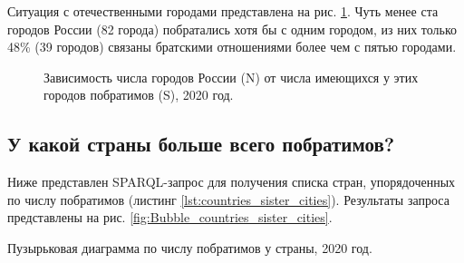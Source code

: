 Ситуация с отечественными городами представлена на рис. \ref{fig:city_relation_Russia_S_N}. Чуть менее ста городов России (82 города) побратались хотя бы с одним городом, из них только 48\% (39 городов) связаны братскими отношениями более чем с пятью городами.

\begin{figure}
{
\setlength{\fboxsep}{0pt}%
\setlength{\fboxrule}{1pt}%
}
  \caption{Зависимость числа городов России (N) от числа имеющихся у этих городов побратимов (S), 2020 год.}
  \label{fig:city_relation_Russia_S_N}
\end{figure}

\subsection{У какой страны больше всего побратимов?}


Ниже представлен SPARQL-запрос для получения списка стран, упорядоченных по числу побратимов (листинг \ref{lst:countries_sister_cities}). Результаты запроса представлены на рис. \ref{fig:Bubble_countries_sister_cities}.

\begin{marginfigure}[0.5cm]
{
\setlength{\fboxsep}{0pt}%
\setlength{\fboxrule}{1pt}%
%
}
  \caption{Пузырьковая диаграмма по числу побратимов у страны, 2020 год.}%
  \label{fig:Bubble_countries_sister_cities}%
\end{marginfigure}


